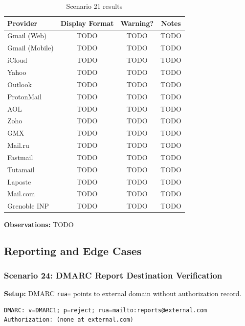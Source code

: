 \documentclass[11pt,a4paper]{article}
\begin{document}
\begin{table}[h]
\centering
\small
\begin{tabular}{lccc}
\toprule
\textbf{Provider} & \textbf{Display Format} & \textbf{Warning?} & \textbf{Notes} \\
\midrule
Gmail (Web) & TODO & TODO & TODO \\
Gmail (Mobile) & TODO & TODO & TODO \\
iCloud & TODO & TODO & TODO \\
Yahoo & TODO & TODO & TODO \\
Outlook & TODO & TODO & TODO \\
ProtonMail & TODO & TODO & TODO \\
AOL & TODO & TODO & TODO \\
Zoho & TODO & TODO & TODO \\
GMX & TODO & TODO & TODO \\
Mail.ru & TODO & TODO & TODO \\
Fastmail & TODO & TODO & TODO \\
Tutamail & TODO & TODO & TODO \\
Laposte & TODO & TODO & TODO \\
Mail.com & TODO & TODO & TODO \\
Grenoble INP & TODO & TODO & TODO \\
\bottomrule
\end{tabular}
\caption{Scenario 21 results}
\end{table}

\textbf{Observations:} TODO

\subsection{Reporting and Edge Cases}

\subsubsection{Scenario 24: DMARC Report Destination Verification}

\textbf{Setup:} DMARC \texttt{rua=} points to external domain without authorization record.

\begin{lstlisting}
DMARC: v=DMARC1; p=reject; rua=mailto:reports@external.com
Authorization: (none at external.com)
\end{lstlisting}
\end{document}
